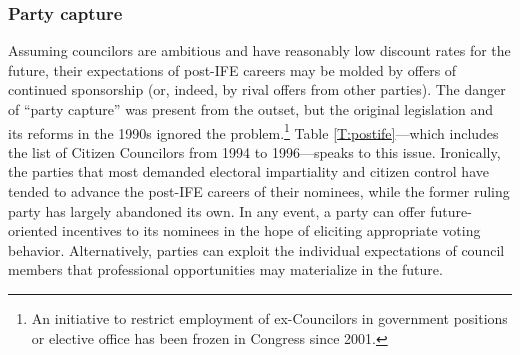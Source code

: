 \documentclass[12 pt, letter]{article}
\begin{document}
\subsubsection{Party capture}
Assuming councilors are ambitious and have reasonably low discount rates for the future, their expectations of post-IFE careers may be molded by offers of continued sponsorship (or, indeed, by rival offers from other parties).  The danger of ``party capture'' was present from the outset, but the original legislation and its reforms in the 1990s ignored the problem.\footnote{An initiative to restrict employment of ex-Councilors in government positions or elective office has been frozen in Congress since 2001.}  Table \ref{T:postife}---which includes the list of Citizen Councilors from 1994 to 1996---speaks to this issue.  Ironically, the parties that most demanded electoral impartiality and citizen control have tended to advance the post-IFE careers of their nominees, while the former ruling party has largely abandoned its own.  In any event, a party can offer future-oriented incentives to its nominees in the hope of eliciting appropriate voting behavior.  Alternatively, parties can exploit the individual expectations of council members that professional opportunities may materialize in the future.
\end{document}
